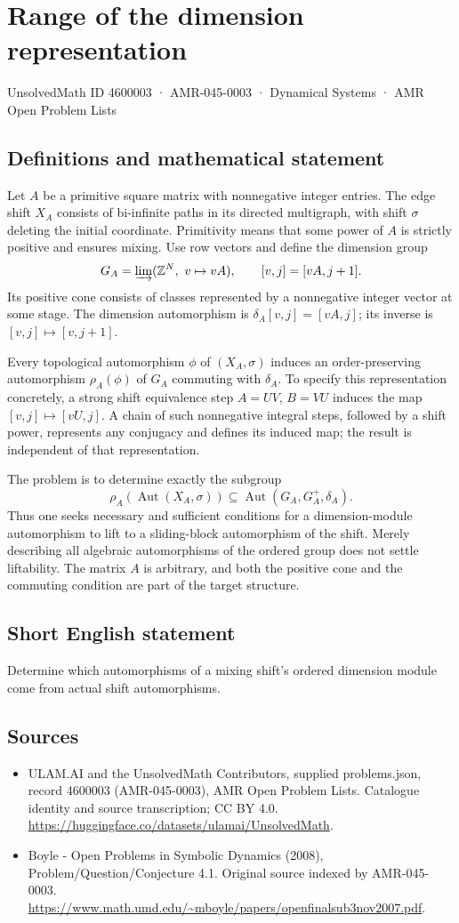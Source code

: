 \documentclass[11pt,a4paper]{article}
\begin{document}
\section*{Range of the dimension representation}\label{4600003}
{\small UnsolvedMath ID 4600003 · AMR-045-0003 · Dynamical Systems · AMR Open Problem Lists}
\subsection{Definitions and mathematical statement}
Let $A$ be a primitive square matrix with nonnegative integer entries.
The edge shift $X_A$ consists of bi-infinite paths in its directed
multigraph, with shift $\sigma$ deleting the initial coordinate. Primitivity
means that some power of $A$ is strictly positive and ensures mixing.
Use row vectors and define the dimension group
\[
 G_A=\varinjlim(\mathbb Z^N,\ v\mapsto vA),
 \qquad [v,j]=[vA,j+1].
\]
Its positive cone consists of classes represented by a nonnegative
integer vector at some stage. The dimension automorphism is
$\delta_A[v,j]=[vA,j]$; its inverse is $[v,j]\mapsto[v,j+1]$.

Every topological automorphism $\phi$ of $(X_A,\sigma)$ induces an
order-preserving automorphism $\rho_A(\phi)$ of $G_A$ commuting with
$\delta_A$. To specify this representation concretely, a strong shift
equivalence step $A=UV$, $B=VU$ induces the map
$[v,j]\mapsto[vU,j]$. A chain of such nonnegative integral steps, followed
by a shift power, represents any conjugacy and defines its induced map;
the result is independent of that representation.

The problem is to determine exactly the subgroup
\[
 \rho_A(\operatorname{Aut}(X_A,\sigma))
       \subseteq\operatorname{Aut}(G_A,G_A^+,\delta_A).
\]
Thus one seeks necessary and sufficient conditions for a dimension-module
automorphism to lift to a sliding-block automorphism of the shift.
Merely describing all algebraic automorphisms of the ordered group does
not settle liftability. The matrix $A$ is arbitrary, and both the positive
cone and the commuting condition are part of the target structure.
\subsection{Short English statement}
Determine which automorphisms of a mixing shift’s ordered dimension module come from actual shift automorphisms.
\subsection{Sources}
\begin{itemize}
\item[S1] ULAM.AI and the UnsolvedMath Contributors, supplied problems.json, record 4600003 (AMR-045-0003), AMR Open Problem Lists. Catalogue identity and source transcription; CC BY 4.0.
\url{https://huggingface.co/datasets/ulamai/UnsolvedMath}.
\item[S2] Boyle - Open Problems in Symbolic Dynamics (2008), Problem/Question/Conjecture 4.1. Original source indexed by AMR-045-0003.
\url{https://www.math.umd.edu/~mboyle/papers/openfinalsub3nov2007.pdf}.
\end{itemize}
\end{document}
